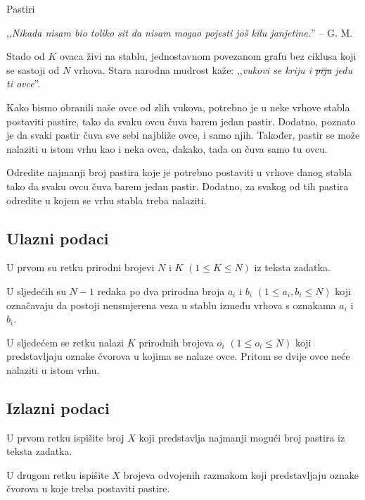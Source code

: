 \begin{statement}[
  problempoints=100,
  timelimit=1 sekunda,
  memorylimit=512 MiB,
]{Pastiri}

,,\textit{Nikada nisam bio toliko sit da nisam mogao pojesti još kilu janjetine.}''
-- G. M.

Stado od $K$ ovaca živi na stablu, jednostavnom povezanom grafu bez ciklusa
koji se sastoji od $N$ vrhova. Stara narodna mudrost kaže: ,,\textit{vukovi
se kriju i \sout{piju} jedu ti ovce}''.

Kako bismo obranili naše ovce od zlih
vukova, potrebno je u neke vrhove stabla postaviti pastire, tako da svaku
ovcu čuva barem jedan pastir. Dodatno, poznato je da svaki pastir čuva sve
sebi najbliže ovce, i samo njih. Također, pastir se može nalaziti u istom vrhu
kao i neka ovca, dakako, tada on čuva samo tu ovcu.

Odredite najmanji broj pastira koje je potrebno postaviti u vrhove danog
stabla tako da svaku ovcu čuva barem jedan pastir. Dodatno, za svakog od
tih pastira odredite u kojem se vrhu stabla treba nalaziti.

\subsection*{Ulazni podaci}
U prvom su retku prirodni brojevi $N$ i $K$ $(1 \le K \le N)$ iz teksta zadatka.

U sljedećih su $N-1$ redaka po dva prirodna broja $a_i$ i $b_i$ $(1 \le a_i, b_i \le N)$ koji
označavaju da postoji neusmjerena veza u stablu između vrhova s oznakama $a_i$ i $b_i$.

U sljedećem se retku nalazi $K$ prirodnih brojeva $o_i$ $(1 \le o_i \le N)$ koji
predstavljaju oznake čvorova u kojima se nalaze ovce. Pritom se dvije ovce
neće nalaziti u istom vrhu.

\subsection*{Izlazni podaci}
U prvom retku ispišite broj $X$ koji predstavlja najmanji mogući broj pastira
iz teksta zadatka.

U drugom retku ispišite $X$ brojeva odvojenih razmakom koji predstavljaju oznake
čvorova u koje treba postaviti pastire.


\end{statement}
